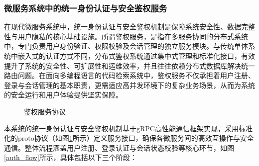 \documentclass[UTF8,a4paper,12pt]{ctexart}
\numberwithin{equation}{section}
\begin{document}
\subsubsection{微服务系统中的统一身份认证与安全鉴权服务}
在现代微服务系统中，统一身份认证与安全鉴权机制是保障系统安全性、数据完整性与用户隐私的核心基础设施。所谓鉴权服务，是指在多服务协同的分布式系统中，专门负责用户身份验证、权限校验及会话管理的独立服务模块。与传统单体系统中嵌入式的认证方式不同，分布式鉴权系统通过集中式管理和标准化接口，有效提升了系统的安全性、可扩展性和运维效率，并且往往依赖分布式数据库解决统一路由问题。在面向多编程语言的代码检索系统中，鉴权服务不仅承担着用户注册、登录与会话管理的基本职责，更需适应高并发环境下的复杂业务场景，从而为系统的安全运行和用户体验提供坚实保障。
\begin{figure}[H]
	\caption{鉴权服务协议}
	\label{auth}
\end{figure}
本系统的统一身份认证与安全鉴权机制基于gRPC高性能通信框架实现，采用标准化的proto协议（如图\ref{auth}所示）定义服务接口，确保各微服务间的高效互操作与安全通信。整体流程涵盖用户注册、登录认证与会话状态校验等核心环节，如图\ref{auth_flow}所示，具体包括以下三个阶段：\par
\end{document}
